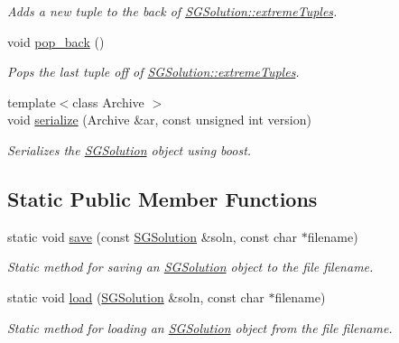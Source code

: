 \begin{DoxyCompactItemize}
\begin{DoxyCompactList}\small\item\em Adds a new tuple to the back of \hyperlink{classSGSolution_a8b3448a35113785102b6c5193ab87dc6}{S\-G\-Solution\-::extreme\-Tuples}. \end{DoxyCompactList}\item 
\hypertarget{classSGSolution_aa3813b739fd539a4f6b20d0bb647b71d}{void \hyperlink{classSGSolution_aa3813b739fd539a4f6b20d0bb647b71d}{pop\-\_\-back} ()}\label{classSGSolution_aa3813b739fd539a4f6b20d0bb647b71d}

\begin{DoxyCompactList}\small\item\em Pops the last tuple off of \hyperlink{classSGSolution_a8b3448a35113785102b6c5193ab87dc6}{S\-G\-Solution\-::extreme\-Tuples}. \end{DoxyCompactList}\item 
\hypertarget{classSGSolution_a8c2f4af49071c5b3e55e232dfc9cebed}{{\footnotesize template$<$class Archive $>$ }\\void \hyperlink{classSGSolution_a8c2f4af49071c5b3e55e232dfc9cebed}{serialize} (Archive \&ar, const unsigned int version)}\label{classSGSolution_a8c2f4af49071c5b3e55e232dfc9cebed}

\begin{DoxyCompactList}\small\item\em Serializes the \hyperlink{classSGSolution}{S\-G\-Solution} object using boost. \end{DoxyCompactList}\end{DoxyCompactItemize}
\subsection*{Static Public Member Functions}
\begin{DoxyCompactItemize}
\item 
\hypertarget{classSGSolution_a9b68d89b32ad1f70a69912bbe414f73b}{static void \hyperlink{classSGSolution_a9b68d89b32ad1f70a69912bbe414f73b}{save} (const \hyperlink{classSGSolution}{S\-G\-Solution} \&soln, const char $\ast$filename)}\label{classSGSolution_a9b68d89b32ad1f70a69912bbe414f73b}

\begin{DoxyCompactList}\small\item\em Static method for saving an \hyperlink{classSGSolution}{S\-G\-Solution} object to the file filename. \end{DoxyCompactList}\item 
\hypertarget{classSGSolution_a1a26602ae51e5dd9186d4f358f66ae4b}{static void \hyperlink{classSGSolution_a1a26602ae51e5dd9186d4f358f66ae4b}{load} (\hyperlink{classSGSolution}{S\-G\-Solution} \&soln, const char $\ast$filename)}\label{classSGSolution_a1a26602ae51e5dd9186d4f358f66ae4b}

\begin{DoxyCompactList}\small\item\em Static method for loading an \hyperlink{classSGSolution}{S\-G\-Solution} object from the file filename. \end{DoxyCompactList}\end{DoxyCompactItemize}
